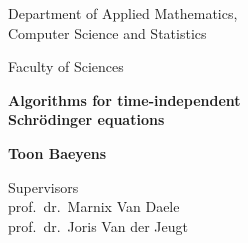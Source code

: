 \begin{titlepage}


    \begin{minipage}{6cm}
        \begin{flushleft}
            Department of Applied Mathematics, \\
            Computer Science and Statistics

            \vspace{3mm}

            {Faculty of Sciences}
        \end{flushleft}
    \end{minipage}

    \vspace{4cm}

    \begin{center}
        {\selectfont
        \textbf{ Algorithms for time-independent\\Schrödinger equations}
        }


        \vspace{5mm}

        \textbf{ Toon Baeyens}

    \end{center}

    \vspace{1cm}

    \begin{flushleft}
        Supervisors \\
        prof.\ dr.\ Marnix Van Daele\\
        prof.\ dr.\ Joris Van der Jeugt
    \end{flushleft}


\end{titlepage}
